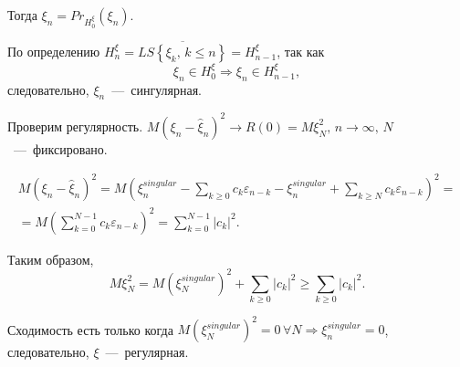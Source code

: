 Тогда $ \xi_n = Pr_{H_0^{ \xi }} \left( \xi_n \right) $.

По определению
$H_n^{ \xi } =
  \overline{LS \left\{ \xi_k, \, k \leq n \right\} } =
  H_{n - 1}^{ \xi }$,
так как
\begin{equation*}
  \xi_n \in H_0^{ \xi } \Rightarrow
  \xi_n \in H_{n - 1}^{ \xi },
\end{equation*}
следовательно, $ \xi_n$~---~сингулярная.

Проверим регулярность.
$M \left( \xi_n - \hat{ \xi }_n \right)^2 \to R \left( 0 \right) = M \xi_N^2, \,
  n \to \infty, \,
  N$~---~фиксировано.

\begin{gather*}
  M \left( \xi_n - \hat{ \xi }_n \right)^2 =
  M \left(
    \xi_n^{singular} - \sum \limits_{k \geq 0} c_k \varepsilon_{n - k} - \xi_n^{singular} +
    \sum \limits_{k \geq N} c_k \varepsilon_{n - k}
  \right)^2 = \\
  = M \left( \sum \limits_{k = 0}^{N - 1} c_k \varepsilon_{n - k} \right)^2 =
  \sum \limits_{k = 0}^{N - 1} \left| c_k \right|^2.
\end{gather*}

Таким образом,
\begin{equation*}
  M \xi_N^2 =
  M \left( \xi_N^{singular} \right)^2 + \sum \limits_{k \geq 0} \left| c_k \right|^2 \geq
  \sum \limits_{k \geq 0} \left| c_k \right|^2.
\end{equation*}

Сходимость есть только когда
$M \left( \xi_N^{singular} \right)^2 = 0 \,
  \forall N \Rightarrow
  \xi_n^{singular} = 0$,
следовательно, $ \xi $~---~регулярная.
